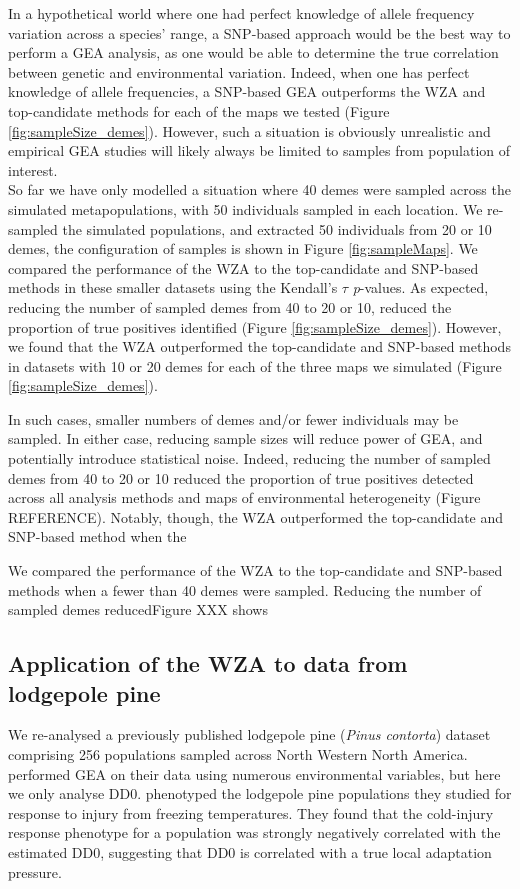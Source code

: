 \documentclass[10pt,twoside,lineno, twocolumn]{GSA_format}
\begin{document}
In a hypothetical world where one had perfect knowledge of allele frequency variation across a species' range, a SNP-based approach would be the best way to perform a GEA analysis, as one would be able to determine the true correlation between genetic and environmental variation. Indeed, when one has perfect knowledge of allele frequencies, a SNP-based GEA outperforms the WZA and top-candidate methods for each of the maps we tested (Figure \ref{fig:sampleSize_demes}). However, such a situation is obviously unrealistic and  empirical GEA studies will likely always be limited to samples from population of interest. \\

So far we have only modelled a situation where 40 demes were sampled across the simulated metapopulations, with 50 individuals sampled in each location. We re-sampled the simulated populations, and extracted 50 individuals from 20 or 10 demes, the configuration of samples is shown in Figure \ref{fig:sampleMaps}. We compared the performance of the WZA to the top-candidate and SNP-based methods in these smaller datasets using the Kendall's $\tau$ \textit{p}-values. As expected, reducing the number of sampled demes from 40 to 20 or 10, reduced the proportion of true positives identified (Figure \ref{fig:sampleSize_demes}). However, we found that the WZA outperformed the top-candidate and SNP-based methods in datasets with 10 or 20 demes for each of the three maps we simulated (Figure \ref{fig:sampleSize_demes}).

In such cases, smaller numbers of demes and/or fewer individuals may be sampled. In either case, reducing sample sizes will reduce power of GEA, and potentially introduce statistical noise.
Indeed, reducing the number of sampled demes from 40 to 20 or 10 reduced the proportion of true positives detected across all analysis methods and maps of environmental heterogeneity (Figure REFERENCE). Notably, though, the WZA outperformed the top-candidate and SNP-based method when the  

We compared the performance of the WZA to the top-candidate and SNP-based methods when a fewer than 40 demes were sampled. Reducing the number of sampled demes reducedFigure XXX shows 

\subsection{Application of the WZA to data from lodgepole pine}

We re-analysed a previously published \citep{Yeaman2016} lodgepole pine (\textit{Pinus contorta}) dataset comprising 256 populations sampled across North Western North America.\cite{Yeaman2016} performed GEA on their data using numerous environmental variables, but here we only analyse DD0. \cite{Yeaman2016} phenotyped the lodgepole pine populations they studied for response to injury from freezing temperatures. They found that the cold-injury response phenotype for a population was strongly negatively correlated with the estimated DD0, suggesting that DD0 is correlated with a true local adaptation pressure. \\
\end{document}
